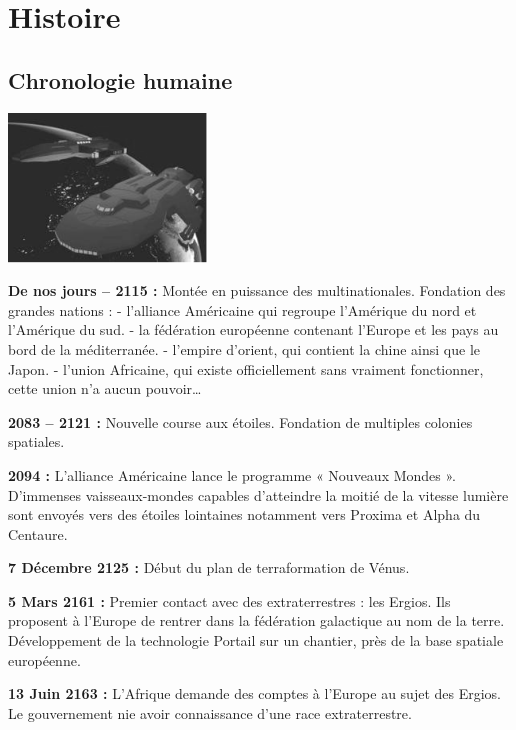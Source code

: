 \part{Histoire}

\chapter{Chronologie humaine}

\begin{multicols}{2}

\begin{center}
	\includegraphics[width=150pt]{image/vaisseau5.png}
\end{center}

\textbf{De nos jours  – 2115 :} Montée en puissance des multinationales. Fondation des grandes nations :  
- l’alliance Américaine qui regroupe l’Amérique du nord et l’Amérique du sud.
- la fédération européenne contenant l’Europe et les pays au bord de la méditerranée. 
- l’empire d’orient, qui contient la chine ainsi que le Japon.
- l’union Africaine, qui existe officiellement sans vraiment fonctionner, cette union n’a aucun pouvoir…

\textbf{2083 – 2121 :} Nouvelle course aux étoiles. Fondation de multiples colonies spatiales.

\textbf{2094 :} L’alliance Américaine lance le programme « Nouveaux Mondes ». D’immenses vaisseaux-mondes capables d’atteindre la moitié de la vitesse lumière sont envoyés vers des étoiles lointaines notamment vers Proxima et Alpha du Centaure.

\textbf{7 Décembre 2125 :} Début du plan de terraformation de Vénus.

\textbf{5 Mars 2161 :} Premier contact avec des extraterrestres : les Ergios. Ils proposent à l’Europe de rentrer dans la fédération galactique au nom de la terre. Développement de la technologie Portail sur un chantier, près de la base spatiale européenne.
 
\textbf{13 Juin 2163 :} L’Afrique demande des comptes à l’Europe au sujet des Ergios. Le gouvernement nie avoir connaissance d’une race extraterrestre. 
 

\end{multicols}
